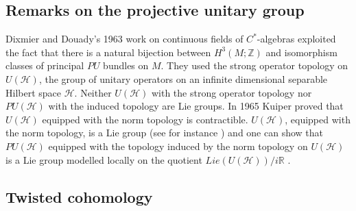 \documentclass[a4paper,reqno]{amsart}
\theoremstyle{plain}
\theoremstyle{definition}
\theoremstyle{remark}
\numberwithin{equation}{section}
\numberwithin{figure}{section}
\newcommand{\RR}{{\mathbb R}}
\newcommand{\ZZ}{{\mathbb Z}}
\newcommand{\<}{\langle}
\renewcommand{\>}{\rangle}
\begin{document}
     
\subsection{Remarks on the projective unitary group} 

Dixmier and Douady's 1963 work on continuous fields of 
$C^*$-algebras exploited the fact that there is a 
natural bijection between $H^3(M;\ZZ)$ and isomorphism 
classes of principal $PU$ bundles on $M$.  They used 
the strong operator topology on $U(\mathcal{H})$, the group of unitary 
operators on an infinite dimensional separable Hilbert space 
$\mathcal{H}$.  Neither $U(\mathcal{H})$ with the 
strong operator topology nor $PU(\mathcal{H})$ with the 
induced topology are Lie groups.     
In 1965 Kuiper proved that $U(\mathcal{H})$ 
equipped with the norm topology is contractible.  
$U(\mathcal{H})$, equipped with the norm topology, is a Lie group 
(see for instance \cite{Milnor}) 
and one can show that $PU(\mathcal{H})$ equipped with the 
topology induced by the norm topology on $U(\mathcal{H})$ 
is a Lie group modelled locally on the quotient 
$Lie(U(\mathcal{H}))/i\RR$ \cite{Tol}. 


\subsection{Twisted cohomology} 
\end{document}
